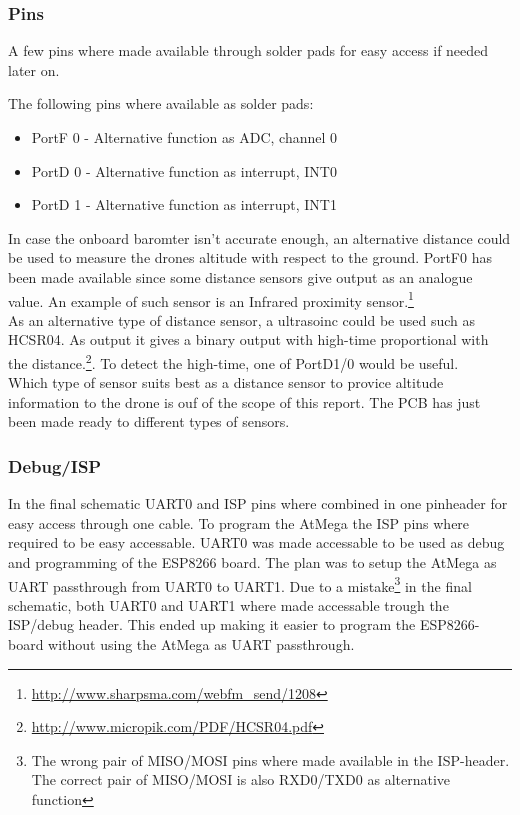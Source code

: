 \subsubsection{Pins}
A few pins where made available through solder pads for easy access if needed later on.

The following pins where available as solder pads:
\begin{itemize}
	\item PortF 0 - Alternative function as ADC, channel 0
	\item PortD 0 - Alternative function as interrupt, INT0
	\item PortD 1 - Alternative function as interrupt, INT1
\end{itemize}
In case the onboard baromter isn't accurate enough, an alternative distance could be used to measure the drones altitude with respect to the ground.
PortF0 has been made available since some distance sensors give output as an analogue value. 
An example of such sensor is an Infrared proximity sensor.\footnote{\url{http://www.sharpsma.com/webfm\_send/1208}} \\
As an alternative type of distance sensor, a ultrasoinc could be used such as HCSR04.
As output it gives a binary output with high-time proportional with the distance.\footnote{\url{http://www.micropik.com/PDF/HCSR04.pdf}}.
To detect the high-time, one of PortD1/0 would be useful. \\

Which type of sensor suits best as a distance sensor to provice altitude information to the drone is ouf of the scope of this report. The PCB has just been made ready to different types of sensors.

\subsubsection{Debug/ISP}
In the final schematic UART0 and ISP pins where combined in one pinheader for easy access through one cable. 
To program the AtMega the ISP pins where required to be easy accessable. 
UART0 was made accessable to be used as debug and programming of the ESP8266 board.
The plan was to setup the AtMega as UART passthrough from UART0 to UART1.
Due to a mistake\footnote{The wrong pair of MISO/MOSI pins where made available in the ISP-header. The correct pair of MISO/MOSI is also RXD0/TXD0 as alternative function} in the final schematic, both UART0 and UART1 where made accessable trough the ISP/debug header. 
This ended up making it easier to program the ESP8266-board without using the AtMega as UART passthrough.
